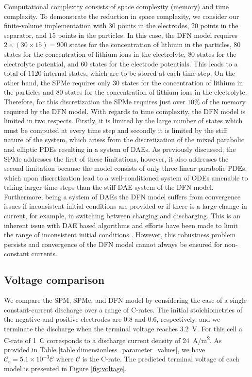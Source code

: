 \documentclass[a4paper]{article}
\newcommand{\ts}[1]{_{\text{#1}}}
\begin{document}
Computational complexity consists of space complexity (memory) and time complexity. To demonstrate the reduction in space complexity, we consider our finite-volume implementation with $30$ points in the electrodes, $20$ points in the separator, and $15$ points in the particles. In this case, the DFN model requires $2\times(30 \times 15)=900$ states for the concentration of lithium in the particles, $80$ states for the concentration of lithium ions in the electrolyte, $80$ states for the electrolyte potential, and $60$ states for the electrode potentials. This leads to a total of $1120$ internal states, which are to be stored at each time step. On the other hand, the SPMe requires only $30$ states for the concentration of lithium in the particles and $80$ states for the concentration of lithium ions in the electrolyte. Therefore, for this discretization the SPMe requires just over $10\%$ of the memory required by the DFN model. With regards to time complexity, the DFN model is limited in two respects. Firstly, it is limited by the large number of states which must be computed at every time step and secondly it is limited by the stiff nature of the system, which arises from the discretization of the mixed parabolic and elliptic PDEs resulting in a system of DAEs. As previously discussed, the SPMe addresses the first of these limitations, however, it also addresses the second limitation because the model consists of only three linear parabolic PDEs, which upon discretization lead to a well-conditioned system of ODEs amenable to taking larger time steps than the stiff DAE system of the DFN model. Furthermore, being a system of DAEs the DFN model suffers from convergence issues if inconsistent initial conditions are provided or if there is a large change in current, for example, in switching between charging and discharging. This is an inherent issue with DAE based algorithms and efforts have been made to limit the range of inconsistent initial conditions \cite{Methekar2011}. However, this robustness problem persists and convergence of the DFN model cannot always be ensured for non-constant currents. 

\subsection{Voltage comparison}
We compare the SPM, SPMe, and DFN model by considering the case of a single constant-current discharge over a range of C-rates. The initial stoichiometries of the negative and positive electrodes are 0.8 and 0.6, respectively, and we terminate the discharge when the terminal voltage reaches \SI{3.2}{V}. For this cell a C-rate of \SI{1}{C} corresponds to a discharge current density of \SI{24}{A/m^2}. As provided in Table \ref{table:dimensionless_parameter_values}, we have $\mathcal{C}\ts{e}=5.1\times 10^{-3}\mathcal{C}$ where $\mathcal{C}$ is the C-rate. The predicted terminal voltage of each model is presented in Figure \ref{fig:voltage}. 
\end{document}
